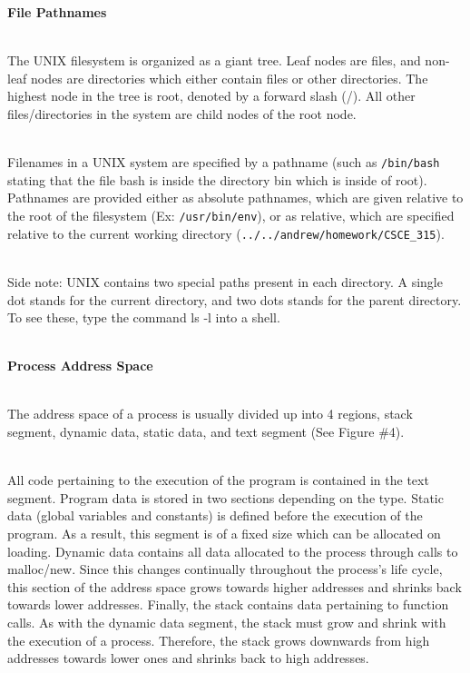 \documentclass[12pt]{extarticle}
\newenvironment{myindentpar}[1]%
 {\begin{list}{}%
         {\setlength{\leftmargin}{#1}}%
         \item[]%
 }
 {\end{list}}
\newcommand{\code}[1]{\colorbox{codegray}{\texttt{#1}}}
\begin{document}
\begin{myindentpar}{5mm}

    \vspace{3mm}
    \noindent
    \textbf{File Pathnames}
    
    \ \\
    The UNIX filesystem is organized as a giant tree.  Leaf nodes are files, and non-leaf nodes are directories which either contain files or other directories.  The highest node in the tree is root, denoted by a forward slash (/).  All other files/directories in the system are child nodes of the root node.  
    
    \ \\
    Filenames in a UNIX system are specified by a pathname (such as \code{/bin/bash} stating that the file bash is inside the directory bin which is inside of root).  Pathnames are provided either as absolute pathnames, which are given relative to the root of the filesystem (Ex: \code{/usr/bin/env}), or as relative, which are specified relative to the current working directory (\code{../../andrew/homework/CSCE\_315}).  
    
    \ \\
    Side note: UNIX contains two special paths present in each directory.  A single dot stands for the current directory, and two dots stands for the parent directory.  To see these, type the command ls -l into a shell.  
    
    \ \\
    \textbf{Process Address Space}
    
    \ \\
    The address space of a process is usually divided up into 4 regions, stack segment, dynamic data, static data, and text segment (See Figure \#4).  
    
    \ \\
    All code pertaining to the execution of the program is contained in the text segment.  Program data is stored in two sections depending on the type.  Static data (global variables and constants) is defined before the execution of the program.  As a result, this segment is of a fixed size which can be allocated on loading.  Dynamic data contains all data allocated to the process through calls to malloc/new.  Since this changes continually throughout the process's life cycle, this section of the address space grows towards higher addresses and shrinks back towards lower addresses.  Finally, the stack contains data pertaining to function calls.  As with the dynamic data segment, the stack must grow and shrink with the execution of a process.  Therefore, the stack grows downwards from high addresses towards lower ones and shrinks back to high addresses.  

\end{myindentpar}
\end{document}
